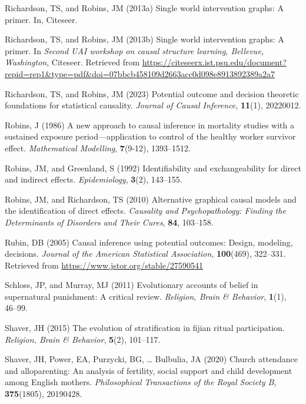 \documentclass[
  single column]{article}
\newlength{\cslhangindent}
\newenvironment{CSLReferences}[2] %
 {\begin{list}{}{%
  \setlength{\itemindent}{0pt}
  \setlength{\leftmargin}{0pt}
  \setlength{\parsep}{0pt}
  \ifodd #1
   \setlength{\leftmargin}{\cslhangindent}
   \setlength{\itemindent}{-1\cslhangindent}
  \fi
  \setlength{\itemsep}{#2\baselineskip}}}
 {\end{list}}
\begin{document}
\begin{CSLReferences}{1}{0}
Richardson, TS, and Robins, JM (2013a) Single world intervention graphs:
A primer. In, Citeseer.

Richardson, TS, and Robins, JM (2013b) Single world intervention graphs:
A primer. In \emph{Second UAI workshop on causal structure learning,
{B}ellevue, {W}ashington}, Citeseer. Retrieved from
\url{https://citeseerx.ist.psu.edu/document?repid=rep1&type=pdf&doi=07bbcb458109d2663acc0d098e8913892389a2a7}

Richardson, TS, and Robins, JM (2023) Potential outcome and decision
theoretic foundations for statistical causality. \emph{Journal of Causal
Inference}, \textbf{11}(1), 20220012.

Robins, J (1986) A new approach to causal inference in mortality studies
with a sustained exposure period---application to control of the healthy
worker survivor effect. \emph{Mathematical Modelling}, \textbf{7}(9-12),
1393--1512.

Robins, JM, and Greenland, S (1992) Identifiability and exchangeability
for direct and indirect effects. \emph{Epidemiology}, \textbf{3}(2),
143--155.

Robins, JM, and Richardson, TS (2010) Alternative graphical causal
models and the identification of direct effects. \emph{Causality and
Psychopathology: Finding the Determinants of Disorders and Their Cures},
\textbf{84}, 103--158.

Rubin, DB (2005) Causal inference using potential outcomes: Design,
modeling, decisions. \emph{Journal of the American Statistical
Association}, \textbf{100}(469), 322--331. Retrieved from
\url{https://www.jstor.org/stable/27590541}

Schloss, JP, and Murray, MJ (2011) Evolutionary accounts of belief in
supernatural punishment: A critical review. \emph{Religion, Brain \&
Behavior}, \textbf{1}(1), 46--99.

Shaver, JH (2015) The evolution of stratification in fijian ritual
participation. \emph{Religion, Brain \& Behavior}, \textbf{5}(2),
101--117.

Shaver, JH, Power, EA, Purzycki, BG, \ldots{} Bulbulia, JA (2020) Church
attendance and alloparenting: An analysis of fertility, social support
and child development among {E}nglish mothers. \emph{Philosophical
Transactions of the Royal Society B}, \textbf{375}(1805), 20190428.


\end{CSLReferences}
\end{document}
